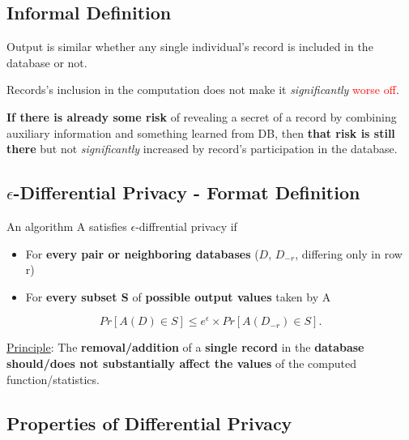 \documentclass[11pt]{article}
\begin{document}
\subsection*{Informal Definition}

Output is similar whether any single individual’s record is included in the database or not.

Records’s inclusion  in the computation does not make it \textit{significantly} \textcolor{red}{worse off}.

\begin{tcolorbox}[
  colback=blue!15,     %
  colframe=black!50,    %
  boxrule=1pt,       %
  arc=3mm,             %
  left=4mm, right=4mm, top=2mm, bottom=2mm %
]
\textbf{If there is already some risk} of revealing a secret of a record by combining auxiliary information and something learned from DB, then \textbf{that risk is still there} but not \textit{significantly} increased by record's participation in the database.
\end{tcolorbox}

\subsection*{$\epsilon$-Differential Privacy - Format Definition}

An algorithm A satisfies $\epsilon$-diffrential privacy if
 \begin{itemize}
	 \item For \textbf{every pair or neighboring databases} ($D$, $D_{-r}$, differing only in row r)
	\item For \textbf{every subset S} of \textbf{possible output values} taken by A 
\end{itemize}
\[
	Pr[A(D) \in S] \leq e^{\epsilon} \times Pr[A(D_{-r}) \in S]
.\] 

\begin{tcolorbox}[
  colback=green!15,     %
  colframe=black!50,    %
  boxrule=1pt,       %
  arc=3mm,             %
  left=4mm, right=4mm, top=2mm, bottom=2mm %
]
\underline{Principle}: The \textbf{removal/addition} of a \textbf{single record} in the \textbf{database should/does not substantially affect the values} of the computed function/statistics. 
\end{tcolorbox}

\subsection*{Properties of Differential Privacy}
\end{document}
